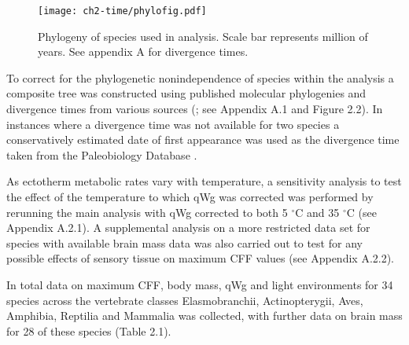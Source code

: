 \begin{figure}[h!]
  \centering
  \texttt{[image: ch2-time/phylofig.pdf]}
  \caption[ ]{Phylogeny of species used in analysis. Scale bar represents million of years. See appendix A for divergence times.}
  \label{fig:Figure 2.2}
\end{figure}


To correct for the phylogenetic nonindependence of species within the analysis a composite tree was constructed using published molecular phylogenies and divergence times from various sources (\cite{schoch1985preliminary,janossy2011pleistocene,mercer2003effects,hedges2006timetree,wiens2006does,benton2007paleontological,murphy2007using,brown2008strong,li2008optimal,naro2008evolutionary,albert2009effect,lim2010phylogeny,little2010evolutionary,perelman2011molecular}; see Appendix A.1 and Figure 2.2). In instances where a divergence time was not available for two species a conservatively estimated date of first appearance was used as the divergence time taken from the Paleobiology Database \citep{alroy2008phanerozoic}.


As ectotherm metabolic rates vary with temperature, a sensitivity analysis to test the effect of the temperature to which qWg was corrected was performed by rerunning the main analysis with qWg corrected to both 5 $^{\circ}$C and 35 $^{\circ}$C (see Appendix A.2.1). A supplemental analysis on a more restricted data set for species with available brain mass data was also carried out to test for any possible effects of sensory tissue on maximum CFF values (see Appendix A.2.2).

In total data on maximum CFF, body mass, qWg and light environments for 34 species across the vertebrate classes Elasmobranchii, Actinopterygii, Aves, Amphibia, Reptilia and Mammalia was collected, with further data on brain mass for 28 of these species (Table 2.1).


